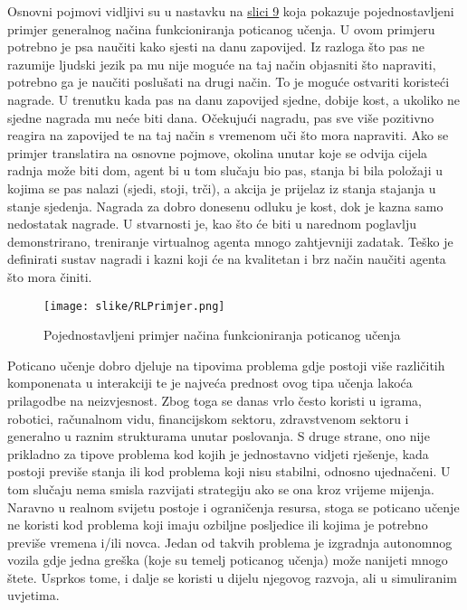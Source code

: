 \documentclass[]{foi} %
\begin{document}
Osnovni pojmovi vidljivi su u nastavku na \hyperref[img: cuko]{slici 9} koja pokazuje pojednostavljeni primjer generalnog načina funkcioniranja poticanog učenja. U ovom primjeru potrebno je psa naučiti kako sjesti na danu zapovijed. Iz razloga što pas ne razumije ljudski jezik pa mu nije moguće na taj način objasniti što napraviti, potrebno ga je naučiti poslušati na drugi način. To je moguće ostvariti koristeći nagrade. U trenutku kada pas na danu zapovijed sjedne, dobije kost, a ukoliko ne sjedne nagrada mu neće biti dana. Očekujući nagradu, pas sve više pozitivno reagira na zapovijed te na taj način s vremenom uči što mora napraviti. Ako se primjer translatira na osnovne pojmove, okolina unutar koje se odvija cijela radnja može biti dom, agent bi u tom slučaju bio pas, stanja bi bila položaji u kojima se pas nalazi (sjedi, stoji, trči), a akcija je prijelaz iz stanja stajanja u stanje sjedenja. Nagrada za dobro donesenu odluku je kost, dok je kazna samo nedostatak nagrade. U stvarnosti je, kao što će biti u narednom poglavlju demonstrirano, treniranje virtualnog agenta mnogo zahtjevniji zadatak. Teško je definirati sustav nagradi i kazni koji će na kvalitetan i brz način naučiti agenta što mora činiti.

\begin{figure}[H]
    \centering
    \texttt{[image: slike/RLPrimjer.png]}
    \caption{Pojednostavljeni primjer načina funkcioniranja poticanog učenja}
\end{figure}
\label{img: cuko}

Poticano učenje dobro djeluje na tipovima problema gdje postoji više različitih komponenata u interakciji te je najveća prednost ovog tipa učenja lakoća prilagodbe na neizvjesnost. Zbog toga se danas vrlo često koristi u igrama, robotici, računalnom vidu, financijskom sektoru, zdravstvenom sektoru i generalno u raznim strukturama unutar poslovanja. S druge strane, ono nije prikladno za tipove problema kod kojih je jednostavno vidjeti rješenje, kada postoji previše stanja ili kod problema koji nisu stabilni, odnosno ujednačeni. U tom slučaju nema smisla razvijati strategiju ako se ona kroz vrijeme mijenja. Naravno u realnom svijetu postoje i ograničenja resursa, stoga se poticano učenje ne koristi kod problema koji imaju ozbiljne posljedice ili kojima je potrebno previše vremena i/ili novca. Jedan od takvih problema je izgradnja autonomnog vozila gdje jedna greška (koje su temelj poticanog učenja) može nanijeti mnogo štete. Usprkos tome, i dalje se koristi u dijelu njegovog razvoja, ali u simuliranim uvjetima. 
\end{document}

